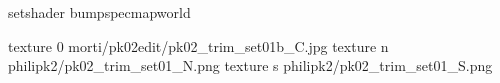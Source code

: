 setshader bumpspecmapworld

texture 0 morti/pk02edit/pk02_trim_set01b_C.jpg
texture n philipk2/pk02_trim_set01_N.png
texture s philipk2/pk02_trim_set01_S.png

